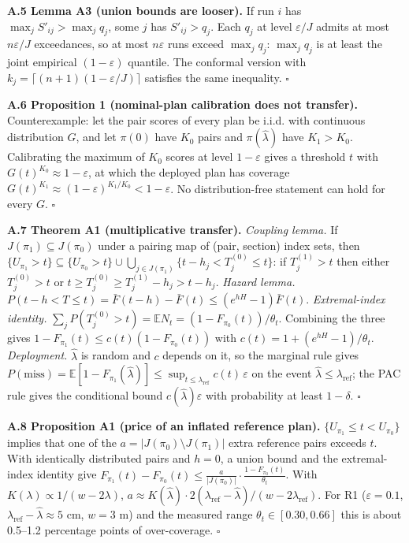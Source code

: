 \documentclass[preprint,12pt,authoryear]{elsarticle}
\begin{document}
\textbf{A.5 Lemma A3 (union bounds are looser).} If run \(i\) has \(\max_jS'_{ij}>\max_jq_j\), some \(j\) has \(S'_{ij}>q_j\). Each \(q_j\) at level \(\varepsilon/J\) admits at most \(n\varepsilon/J\) exceedances, so at most \(n\varepsilon\) runs exceed \(\max_jq_j\): \(\max_jq_j\) is at least the joint empirical \((1-\varepsilon)\) quantile. The conformal version with \(k_j=\lceil(n+1)(1-\varepsilon/J)\rceil\) satisfies the same inequality. \(\square\)

\textbf{A.6 Proposition 1 (nominal-plan calibration does not transfer).} Counterexample: let the pair scores of every plan be i.i.d. with continuous distribution \(G\), and let \(\pi(0)\) have \(K_0\) pairs and \(\pi(\hat\lambda)\) have \(K_1>K_0\). Calibrating the maximum of \(K_0\) scores at level \(1-\varepsilon\) gives a threshold \(t\) with \(G(t)^{K_0}\approx1-\varepsilon\), at which the deployed plan has coverage \(G(t)^{K_1}\approx(1-\varepsilon)^{K_1/K_0}<1-\varepsilon\). No distribution-free statement can hold for every \(G\). \(\square\)

\textbf{A.7 Theorem A1 (multiplicative transfer).} \emph{Coupling lemma.} If \(J(\pi_1)\subseteq J(\pi_0)\) under a pairing map of (pair, section) index sets, then \(\{U_{\pi_1}>t\}\subseteq\{U_{\pi_0}>t\}\cup\bigcup_{j\in J(\pi_1)}\{t-h_j<T_j^{(0)}\le t\}\): if \(T_j^{(1)}>t\) then either \(T_j^{(0)}>t\) or \(t\ge T_j^{(0)}\ge T_j^{(1)}-h_j>t-h_j\). \emph{Hazard lemma.} \(P(t-h<T\le t)=\bar F(t-h)-\bar F(t)\le(e^{hH}-1)\bar F(t)\). \emph{Extremal-index identity.} \(\sum_jP(T_j^{(0)}>t)=\mathbb EN_t=(1-F_{\pi_0}(t))/\theta_t\). Combining the three gives \(1-F_{\pi_1}(t)\le c(t)(1-F_{\pi_0}(t))\) with \(c(t)=1+(e^{hH}-1)/\theta_t\). \emph{Deployment.} \(\hat\lambda\) is random and \(c\) depends on it, so the marginal rule gives \(P(\text{miss})=\mathbb E[1-F_{\pi_1}(\hat\lambda)]\le\sup_{t\le\lambda_\mathrm{ref}}c(t)\,\varepsilon\) on the event \(\hat\lambda\le\lambda_\mathrm{ref}\); the PAC rule gives the conditional bound \(c(\hat\lambda)\varepsilon\) with probability at least \(1-\delta\). \(\square\)

\textbf{A.8 Proposition A1 (price of an inflated reference plan).} \(\{U_{\pi_1}\le t<U_{\pi_0}\}\) implies that one of the \(a=|J(\pi_0)\setminus J(\pi_1)|\) extra reference pairs exceeds \(t\). With identically distributed pairs and \(h=0\), a union bound and the extremal-index identity give \(F_{\pi_1}(t)-F_{\pi_0}(t)\le\frac{a}{|J(\pi_0)|}\cdot\frac{1-F_{\pi_0}(t)}{\theta_t}\). With \(K(\lambda)\propto1/(w-2\lambda)\), \(a\approx K(\hat\lambda)\cdot2(\lambda_\mathrm{ref}-\hat\lambda)/(w-2\lambda_\mathrm{ref})\). For R1 (\(\varepsilon=0.1\), \(\lambda_\mathrm{ref}-\hat\lambda\approx5\) cm, \(w=3\) m) and the measured range \(\theta_t\in[0.30,0.66]\) this is about 0.5--1.2 percentage points of over-coverage. \(\square\)
\end{document}
